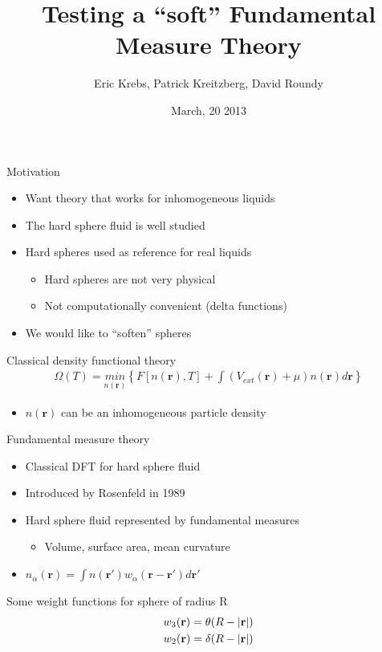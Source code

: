 \documentclass{beamer}
\title[Testing Soft FMT]{Testing a ``soft'' Fundamental Measure Theory}
\author{Eric Krebs, Patrick Kreitzberg, David Roundy}
\institute{Oregon State University}
\date{March, 20 2013}
\newcommand{\rr}{\textbf{r}}
\begin{document}
\begin{frame}
 \titlepage
\end{frame}

\begin{frame}{Motivation}
  \begin{itemize}
    \item Want theory that works for inhomogeneous liquids
    \item The hard sphere fluid is well studied
    \item Hard spheres used as reference for real liquids
      \begin{itemize}
        \item Hard spheres are not very physical
        \item Not computationally convenient (delta functions)
      \end{itemize}
    \item We would like to ``soften'' spheres
  \end{itemize}
  \begin{block}{Classical density functional theory}
    \begin{align}
    \Omega(T) = \underset{n(\rr)}{min} \left\{F[n(\rr),T] + \int
                \left(V_{ext}(\rr) + \mu \right)n(\rr)d\rr \right\}
    \end{align}
    \begin{itemize}
      \item $n(\rr)$ can be an inhomogeneous particle density
    \end{itemize}
  \end{block}
\end{frame}

\begin{frame}{Fundamental measure theory}
  \begin{itemize}
    \item Classical DFT for hard sphere fluid
    \item Introduced by Rosenfeld in 1989
    \item Hard sphere fluid represented by fundamental measures
    \begin{itemize}
      \item Volume, surface area, mean curvature
    \end{itemize}
    \item $n_{\alpha}(\rr) = \int n(\rr')w_{\alpha}(\rr - \rr')d\rr'$
  \end{itemize}
  \begin{block}{Some weight functions for sphere of radius R}
    \begin{align}
      w_3(\rr) = \theta (R - |\rr|) \\
      w_2(\rr) = \delta (R - |\rr|) \\
      \notag
    \end{align}
  \end{block}
\end{frame}
\end{document}
